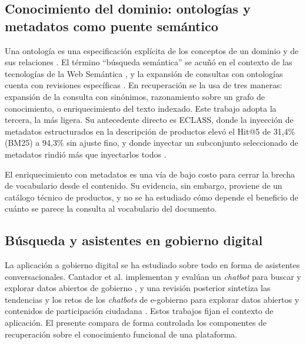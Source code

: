 \documentclass[11pt,letterpaper]{article}
\numberwithin{equation}{section}
\begin{document}
\subsection{Conocimiento del dominio: ontologías y metadatos como puente semántico}
\label{sec:ea-ontologia}
Una ontología es una especificación explícita de los conceptos de un dominio y de sus relaciones \cite{gruber1993ontologia}. El término ``búsqueda semántica'' se acuñó en el contexto de las tecnologías de la Web Semántica \cite{guha2003semantic}, y la expansión de consultas con ontologías cuenta con revisiones específicas \cite{bhogal2007ontology}. En recuperación se la usa de tres maneras: expansión de la consulta con sinónimos, razonamiento sobre un grafo de conocimiento, o enriquecimiento del texto indexado. Este trabajo adopta la tercera, la más ligera. Su antecedente directo es ECLASS, donde la inyección de metadatos estructurados en la descripción de productos elevó el Hit@5 de 31{,}4\% (BM25) a 94{,}3\% sin ajuste fino, y donde inyectar un subconjunto seleccionado de metadatos rindió más que inyectarlos todos \cite{baumgart2026eclass}.

El enriquecimiento con metadatos es una vía de bajo costo para cerrar la brecha de vocabulario desde el contenido. Su evidencia, sin embargo, proviene de un catálogo técnico de productos, y no se ha estudiado cómo depende el beneficio de cuánto se parece la consulta al vocabulario del documento.

\subsection{Búsqueda y asistentes en gobierno digital}
\label{sec:ea-govtech}
La aplicación a gobierno digital se ha estudiado sobre todo en forma de asistentes conversacionales. Cantador et al. implementan y evalúan un \textit{chatbot} para buscar y explorar datos abiertos de gobierno \cite{cantador2021chatbot}, y una revisión posterior sintetiza las tendencias y los retos de los \textit{chatbots} de e-gobierno para explorar datos abiertos y contenidos de participación ciudadana \cite{cortescediel2023chatbots}. Estos trabajos fijan el contexto de aplicación. El presente compara de forma controlada los componentes de recuperación sobre el conocimiento funcional de una plataforma.
\end{document}
